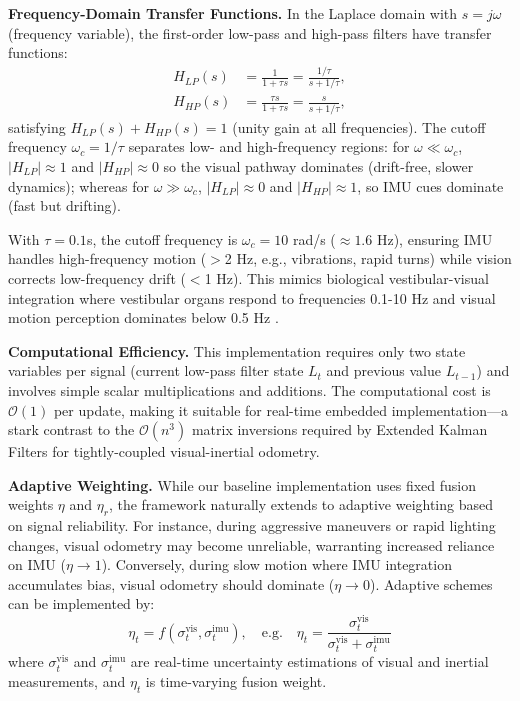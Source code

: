 \textbf{Frequency-Domain Transfer Functions.} In the Laplace domain with $s = j\omega$ (frequency variable), the first-order low-pass and high-pass filters have transfer functions:
\begin{align}
    H_{LP}(s) & = \frac{1}{1 + \tau s} = \frac{1/\tau}{s + 1/\tau}, \label{eq:h_lp} \\
    H_{HP}(s) & = \frac{\tau s}{1 + \tau s} = \frac{s}{s + 1/\tau}, \label{eq:h_hp}
\end{align}
satisfying $H_{LP}(s) + H_{HP}(s) = 1$ (unity gain at all frequencies). The cutoff frequency $\omega_c = 1/\tau$ separates low- and high-frequency regions: for $\omega \ll \omega_c$, $|H_{LP}| \approx 1$ and $|H_{HP}| \approx 0$ so the visual pathway dominates (drift-free, slower dynamics); whereas for $\omega \gg \omega_c$, $|H_{LP}| \approx 0$ and $|H_{HP}| \approx 1$, so IMU cues dominate (fast but drifting).

With $\tau = 0.1$s, the cutoff frequency is $\omega_c = 10$ rad/s ($\approx 1.6$ Hz), ensuring IMU handles high-frequency motion ($>$2 Hz, e.g., vibrations, rapid turns) while vision corrects low-frequency drift ($<$1 Hz). This mimics biological ves\-tib\-u\-lar-visual integration where ves\-tib\-u\-lar organs respond to frequencies 0.1-10 Hz and visual motion perception dominates below 0.5 Hz \cite{Angelaki2004}.

\textbf{Computational Efficiency.} This implementation requires only two state variables per signal (current low-pass filter state $L_t$ and previous value $L_{t-1}$) and involves simple scalar multiplications and additions. The computational cost is $\mathcal{O}(1)$ per update, making it suitable for real-time embedded implementation---a stark contrast to the $\mathcal{O}(n^3)$ matrix inversions required by Extended Kalman Filters for tightly-coupled visual-inertial odometry.

\textbf{Adaptive Weighting.} While our baseline implementation uses fixed fusion weights $\eta$ and $\eta_r$, the framework naturally extends to adaptive weighting based on signal reliability. For instance, during aggressive maneuvers or rapid lighting changes, visual odometry may become unreliable, warranting increased reliance on IMU ($\eta \to 1$). Conversely, during slow motion where IMU integration accumulates bias, visual odometry should dominate ($\eta \to 0$). Adaptive schemes can be implemented by:
\begin{equation}
    \eta_t = f(\sigma^\mathrm{vis}_t, \sigma^\mathrm{imu}_t),\quad \text{e.g.} \quad \eta_t = \frac{\sigma^\mathrm{vis}_t}{\sigma^\mathrm{vis}_t + \sigma^\mathrm{imu}_t}
\end{equation}
where $\sigma_t^\mathrm{vis}$ and $\sigma_t^\mathrm{imu}$ are real-time uncertainty estimations of visual and inertial measurements, and $\eta_t$ is time-varying fusion weight.

